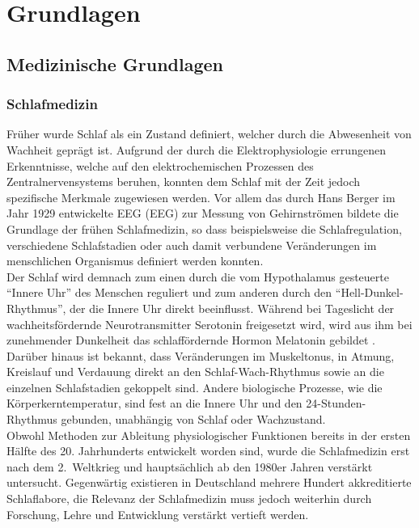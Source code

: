 \chapter{Grundlagen}


\section{Medizinische Grundlagen}\label{medgrundlagen} 


\subsection{Schlafmedizin}\label{schlafmedizin} 

Früher wurde Schlaf als ein Zustand definiert, welcher durch die Abwesenheit von Wachheit geprägt ist. Aufgrund der durch die Elektrophysiologie errungenen Erkenntnisse, welche auf den elektrochemischen Prozessen des Zentralnervensystems beruhen, konnten dem Schlaf mit der Zeit jedoch spezifische Merkmale zugewiesen werden. Vor allem das durch Hans Berger im Jahr 1929 entwickelte \acl{EEG} (\acs{EEG}) zur Messung von Gehirnströmen bildete die Grundlage der frühen Schlafmedizin, so dass beispielsweise die Schlafregulation, verschiedene Schlafstadien oder auch damit verbundene Veränderungen im menschlichen Organismus definiert werden konnten. \parencite{ebner_eeg_2006, penzel_schlafstorungen_2005}\\

Der Schlaf wird demnach zum einen durch die vom Hypothalamus gesteuerte "`Innere Uhr"' des Menschen reguliert und zum anderen durch den "`Hell-Dunkel-Rhythmus"', der die Innere Uhr direkt beeinflusst. Während bei Tageslicht der wachheitsfördernde Neurotransmitter Serotonin freigesetzt wird, wird aus ihm bei zunehmender Dunkelheit das schlaffördernde Hormon Melatonin gebildet \parencite{steinberg_schlafmedizin_2010}. Darüber hinaus ist bekannt, dass Veränderungen im Muskeltonus, in Atmung, Kreislauf und Verdauung direkt an den Schlaf-Wach-Rhythmus sowie an die einzelnen Schlafstadien gekoppelt sind. Andere biologische Prozesse, wie die Körperkerntemperatur, sind fest an die Innere Uhr und den 24-Stunden-Rhythmus gebunden, unabhängig von Schlaf oder Wachzustand. \parencite{penzel_schlafstorungen_2005, rasche_update_2003}\\

Obwohl Methoden zur Ableitung physiologischer Funktionen bereits in der ersten Hälfte des 20. Jahrhunderts entwickelt worden sind, wurde die Schlafmedizin erst nach dem 2.~Weltkrieg und hauptsächlich ab den 1980er Jahren verstärkt untersucht. Gegenwärtig existieren in Deutschland mehrere Hundert akkreditierte Schlaflabore, die Relevanz der Schlafmedizin muss jedoch weiterhin durch Forschung, Lehre und Entwicklung verstärkt vertieft werden.\parencite{penzel_schlafstorungen_2005}\\

